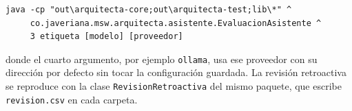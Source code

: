 \begin{verbatim}
java -cp "out\arquitecta-core;out\arquitecta-test;lib\*" ^
     co.javeriana.msw.arquitecta.asistente.EvaluacionAsistente ^
     3 etiqueta [modelo] [proveedor]
\end{verbatim}

\noindent donde el cuarto argumento, por ejemplo \texttt{ollama}, usa ese proveedor con su dirección por defecto sin tocar la configuración guardada. La revisión retroactiva se reproduce con la clase \texttt{RevisionRetroactiva} del mismo paquete, que escribe \texttt{revision.csv} en cada carpeta.
